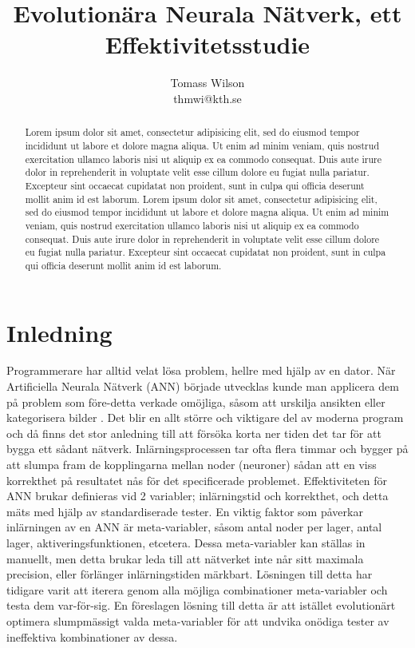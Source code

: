 \documentclass[a4paper, 11pt]{article}
\title{Evolutionära Neurala Nätverk, ett Effektivitetsstudie}
\author{Tomass Wilson\\thmwi@kth.se}
\begin{document}

  \maketitle

  \begin{abstract}
    Lorem ipsum dolor sit amet, consectetur adipisicing elit, sed do eiusmod tempor incididunt ut labore et dolore magna aliqua. Ut enim ad minim veniam, quis nostrud exercitation ullamco laboris nisi ut aliquip ex ea commodo consequat. Duis aute irure dolor in reprehenderit in voluptate velit esse cillum dolore eu fugiat nulla pariatur. Excepteur sint occaecat cupidatat non proident, sunt in culpa qui officia deserunt mollit anim id est laborum. Lorem ipsum dolor sit amet, consectetur adipisicing elit, sed do eiusmod tempor incididunt ut labore et dolore magna aliqua. Ut enim ad minim veniam, quis nostrud exercitation ullamco laboris nisi ut aliquip ex ea commodo consequat. Duis aute irure dolor in reprehenderit in voluptate velit esse cillum dolore eu fugiat nulla pariatur. Excepteur sint occaecat cupidatat non proident, sunt in culpa qui officia deserunt mollit anim id est laborum.
  \end{abstract}

  \newpage

  \tableofcontents

  \newpage


  \section{Inledning}
    Programmerare har alltid velat lösa problem, hellre med hjälp av en dator. När Artificiella Neurala Nätverk (ANN) började utvecklas kunde man applicera dem på problem som före-detta verkade omöjliga, såsom att urskilja ansikten eller kategorisera bilder \parencite{hopfield1988artificial}. Det blir en allt större och viktigare del av moderna program och då finns det stor anledning till att försöka korta ner tiden det tar för att bygga ett sådant nätverk. Inlärningsprocessen tar ofta flera timmar och bygger på att slumpa fram de kopplingarna mellan noder (neuroner) sådan att en viss korrekthet på resultatet nås för det specificerade problemet. Effektiviteten för ANN brukar definieras vid 2 variabler; inlärningstid och korrekthet, och detta mäts med hjälp av standardiserade tester. En viktig faktor som påverkar inlärningen av en ANN är meta-variabler, såsom antal noder per lager, antal lager, aktiveringsfunktionen, etcetera. Dessa meta-variabler kan ställas in manuellt, men detta brukar leda till att nätverket inte når sitt maximala precision, eller förlänger inlärningstiden märkbart. Lösningen till detta har tidigare varit att iterera genom alla möjliga combinationer meta-variabler och testa dem var-för-sig. En föreslagen lösning till detta är att istället evolutionärt optimera slumpmässigt valda meta-variabler för att undvika onödiga tester av ineffektiva kombinationer av dessa.
\end{document}

